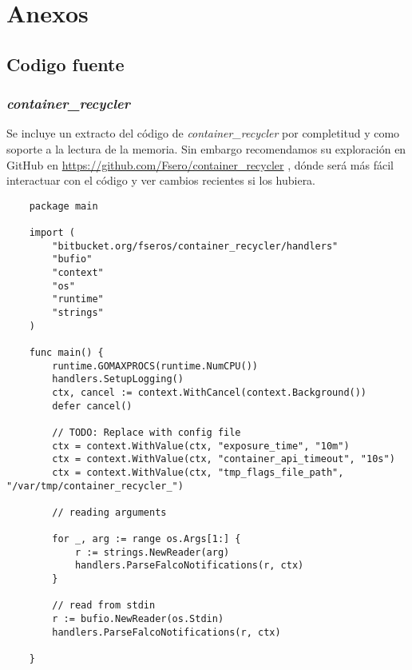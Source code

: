 \chapter{Anexos}

\section{Codigo fuente}

\subsection{\emph{container\_recycler}}
\label{subsec:containe-recycler-src-code}

Se incluye un extracto del código de \emph{container\_recycler} por completitud y como soporte a la lectura de la memoria. Sin
embargo recomendamos su exploración en GitHub en \href{https://github.com/Fsero/container\_recycler}{https://github.com/Fsero/container\_recycler} , dónde será más fácil interactuar con el código y ver cambios recientes si los 
hubiera.

\begin{verbatim}
    package main
    
    import (
        "bitbucket.org/fseros/container_recycler/handlers"
        "bufio"
        "context"
        "os"
        "runtime"
        "strings"
    )
    
    func main() {
        runtime.GOMAXPROCS(runtime.NumCPU())
        handlers.SetupLogging()
        ctx, cancel := context.WithCancel(context.Background())
        defer cancel()
    
        // TODO: Replace with config file
        ctx = context.WithValue(ctx, "exposure_time", "10m")
        ctx = context.WithValue(ctx, "container_api_timeout", "10s")
        ctx = context.WithValue(ctx, "tmp_flags_file_path", "/var/tmp/container_recycler_")
    
        // reading arguments
    
        for _, arg := range os.Args[1:] {
            r := strings.NewReader(arg)
            handlers.ParseFalcoNotifications(r, ctx)
        }
    
        // read from stdin
        r := bufio.NewReader(os.Stdin)
        handlers.ParseFalcoNotifications(r, ctx)
    
    }
    
\end{verbatim}

